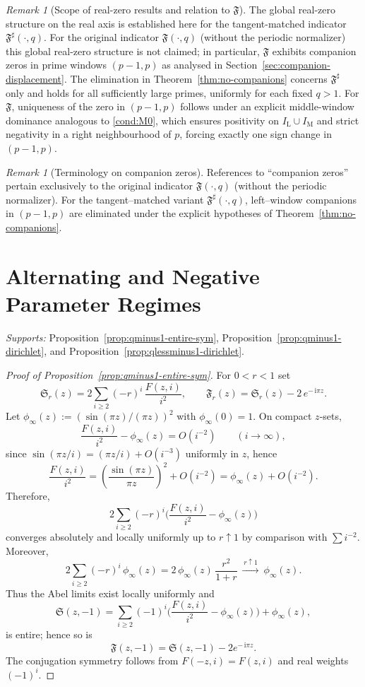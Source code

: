 \documentclass[11pt,a4paper]{amsart}
\newcommand{\ii}{\mathrm{i}}
\newcommand{\Fbase}{\mathfrak F}
\newcommand{\Fsharp}{\Fbase^{\sharp}}
\theoremstyle{plain}
\theoremstyle{definition}
\theoremstyle{remark}
\newtheorem{remark}[theorem]{Remark}
\begin{document}
\begin{remark}[Scope of real-zero results and relation to $\mathfrak F$]\label{rem:scope-f-vs-fsharp}
The global real-zero structure on the real axis is established here for the tangent-matched indicator $\Fsharp(\cdot,q)$. 
For the original indicator $\mathfrak F(\cdot,q)$ (without the periodic normalizer) this global real-zero structure is not claimed; in particular, $\mathfrak F$ exhibits companion zeros in prime windows $(p-1,p)$ as analysed in Section~\ref{sec:companion-displacement}. 
The elimination in Theorem~\ref{thm:no-companions} concerns $\Fsharp$ only and holds for all sufficiently large primes, uniformly for each fixed $q>1$. For $\mathfrak F$, uniqueness of the zero in $(p-1,p)$ follows under an explicit middle-window dominance analogous to \eqref{cond:M0}, which ensures positivity on $I_{\mathrm L}\cup I_{\mathrm M}$ and strict negativity in a right neighbourhood of $p$, forcing exactly one sign change in $(p-1,p)$.
\end{remark}

\begin{remark}[Terminology on companion zeros]
References to ``companion zeros'' pertain exclusively to the original indicator $\mathfrak F(\cdot,q)$ (without the periodic normalizer). For the tangent–matched variant $\Fsharp(\cdot,q)$, left–window companions in $(p-1,p)$ are eliminated under the explicit hypotheses of Theorem~\ref{thm:no-companions}.
\end{remark}


\section{Alternating and Negative Parameter Regimes}\label{app:q-negative}
\noindent\textit{Supports:} Proposition~\ref{prop:qminus1-entire-sym}, Proposition~\ref{prop:qminus1-dirichlet}, and Proposition~\ref{prop:qlessminus1-dirichlet}.


\begin{proof}[Proof of Proposition~\ref{prop:qminus1-entire-sym}]
For $0<r<1$ set
\[
\mathfrak S_r(z)=2\sum_{i\ge2}(-r)^i\,\frac{F(z,i)}{i^2},\qquad
\mathfrak F_r(z)=\mathfrak S_r(z)-2\,e^{-\,\ii\pi z}.
\]
Let $\phi_\infty(z):=(\sin(\pi z)/(\pi z))^2$ with $\phi_\infty(0)=1$. On compact $z$-sets,
\[
\frac{F(z,i)}{i^2}-\phi_\infty(z)=O(i^{-2})\qquad(i\to\infty),
\]
since $\sin(\pi z/i)=(\pi z/i)+O(i^{-3})$ uniformly in $z$, hence
\[
\frac{F(z,i)}{i^2}=\left(\frac{\sin(\pi z)}{\pi z}\right)^2+O(i^{-2})=\phi_\infty(z)+O(i^{-2}).
\]
Therefore,
\[
2\sum_{i\ge2}(-r)^i\Big(\frac{F(z,i)}{i^2}-\phi_\infty(z)\Big)
\]
converges absolutely and locally uniformly up to $r\uparrow 1$ by comparison with $\sum i^{-2}$. Moreover,
\[
2\sum_{i\ge2}(-r)^i\,\phi_\infty(z)=2\,\phi_\infty(z)\,\frac{r^2}{1+r}\ \xrightarrow{\,r\uparrow1\,}\ \phi_\infty(z).
\]
Thus the Abel limits exist locally uniformly and
\[
\mathfrak S(z,-1)=\sum_{i\ge2}(-1)^i\Big(\frac{F(z,i)}{i^2}-\phi_\infty(z)\Big)+\phi_\infty(z),
\]
is entire; hence so is
\[
\mathfrak F(z,-1)=\mathfrak S(z,-1)-2e^{-\,\ii\pi z}.
\]
The conjugation symmetry follows from $F(-z,i)=F(z,i)$ and real weights $(-1)^i$.
\end{proof}
\end{document}
